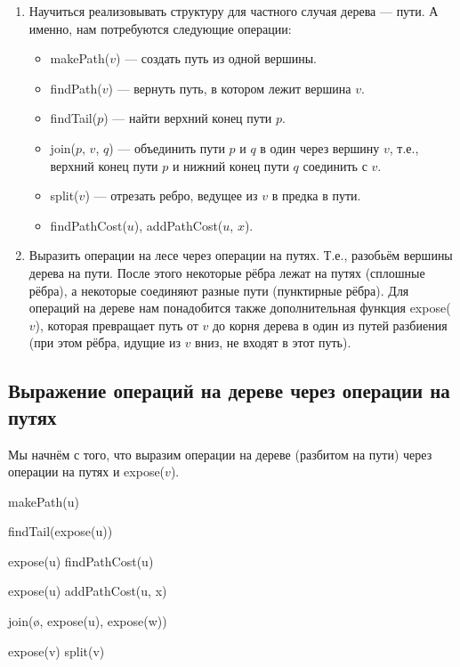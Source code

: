 \begin{enumerate}
    \item Научиться реализовывать структуру для частного случая дерева --- пути. А именно, нам потребуются следующие операции:
        \begin{itemize}
            \item makePath($v$) --- создать путь из одной вершины.
            \item findPath($v$) --- вернуть путь, в котором лежит вершина $v$.
            \item findTail($p$) --- найти верхний конец пути $p$.
            \item join($p$, $v$, $q$) --- объединить пути $p$ и $q$ в один через вершину $v$, т.е., верхний конец пути $p$ и нижний конец пути $q$ соединить с $v$.
            \item split($v$) --- отрезать ребро, ведущее из $v$ в предка в пути.
            \item findPathCost($u$), addPathCost($u$, $x$).
        \end{itemize}
    \item Выразить операции на лесе через операции на путях. Т.е., разобьём вершины дерева на пути. После этого некоторые рёбра лежат на путях (сплошные рёбра), а некоторые соединяют разные пути (пунктирные рёбра). Для операций на дереве нам понадобится также дополнительная функция expose($v$), которая превращает путь от $v$ до корня дерева в один из путей разбиения (при этом рёбра, идущие из $v$ вниз, не входят в этот путь).
\end{enumerate}

\subsection{Выражение операций на дереве через операции на путях}

Мы начнём с того, что выразим операции на дереве (разбитом на пути) через операции на путях и expose($v$).

\begin{algorithmic}[1]
		\State makePath(u)
    \EndProcedure
    
		\State findTail(expose(u))
    \EndProcedure
    
        \State expose(u)
		\State findPathCost(u)
    \EndProcedure
    
        \State expose(u)
		\State addPathCost(u, x)
    \EndProcedure
    
		\State join(\o, expose(u), expose(w))
    \EndProcedure
    
		\State expose(v)
		\State split(v)
    \EndProcedure
	
\end{algorithmic}

